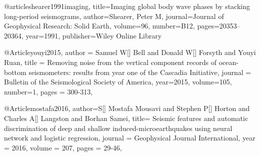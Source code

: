 @article{shearer1991imaging,
  title={Imaging global body wave phases by stacking long-period seismograms},
  author={Shearer, Peter M},
  journal={Journal of Geophysical Research: Solid Earth},
  volume={96},
  number={B12},
  pages={20353--20364},
  year={1991},
  publisher={Wiley Online Library}
}


@Article{youyi2015,
  author =	 {Samuel W[] Bell and Donald W[] Forsyth and Youyi Ruan},
  title =	 {Removing noise from the vertical component records of ocean-bottom seismometers: results from year one of the Cascadia Initiative},
  journal =	 {Bulletin of the Seismological Society of America},
  year=2015,
  volume=105,
  number=1,
  pages =	 {300-313},
}


@Article{mostafa2016,
  author={S[] Mostafa Mousavi and Stephen P[] Horton and Charles A[] Langston and Borhan Samei},
  title={ Seismic features and automatic discrimination of deep and shallow induced-microearthquakes using neural network and logistic regression},
  journal = 	 {Geophysical Journal International},
  year = 	 2016,
  volume =	 207,
  pages =	 {29-46},
}





